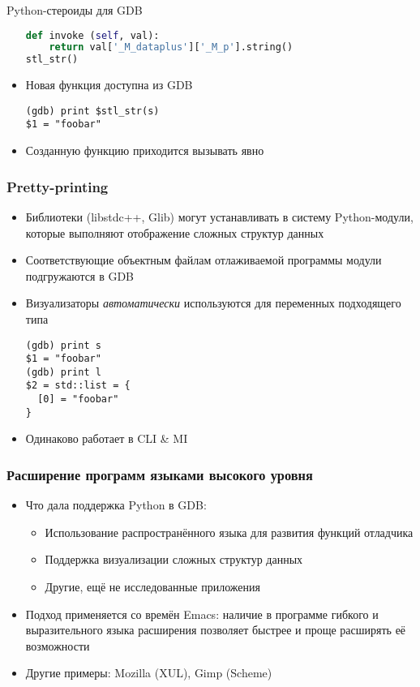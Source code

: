 \documentclass[onlymath]{beamer}
\begin{document}
\begin{subsection}{Python-стероиды для GDB}
\begin{frame}[fragile]
\begin{itemize}
\begin{lstlisting}[language=Python]
  def invoke (self, val):
    return val['_M_dataplus']['_M_p'].string()
stl_str()
\end{lstlisting}
  \item Новая функция доступна из GDB
\begin{lstlisting}[style=gdbsession]
(gdb) print $stl_str(s)
$1 = "foobar"
\end{lstlisting}
  \item Созданную функцию приходится вызывать явно
  \end{itemize}
\end{frame}  

\begin{frame}[fragile]
  \frametitle{Pretty-printing}
  \begin{itemize}
  \item Библиотеки (libstdc++, Glib) могут устанавливать в систему
    Python-модули, которые выполняют отображение сложных структур
    данных
  \item Соответствующие объектным файлам отлаживаемой программы модули
    подгружаются в GDB
  \item Визуализаторы \emph{автоматически} используются для переменных
    подходящего типа
\begin{lstlisting}[style=gdbsession]
(gdb) print s
$1 = "foobar"
(gdb) print l
$2 = std::list = {
  [0] = "foobar"
}
\end{lstlisting}
  \item Одинаково работает в CLI \& MI
  \end{itemize}
\end{frame}
\end{subsection}

\begin{frame}
  \frametitle{Расширение программ языками высокого уровня}
  \begin{itemize}
  \item Что дала поддержка Python в GDB:
    \begin{itemize}
    \item Использование распространённого языка для развития функций
      отладчика
    \item Поддержка визуализации сложных структур данных
    \item Другие, ещё не исследованные приложения
    \end{itemize}
  \item Подход применяется со времён Emacs: наличие в программе
    гибкого и выразительного языка расширения позволяет быстрее и
    проще расширять её возможности
  \item Другие примеры: Mozilla (XUL), Gimp (Scheme)
  \end{itemize}
\end{frame}
\end{document}

